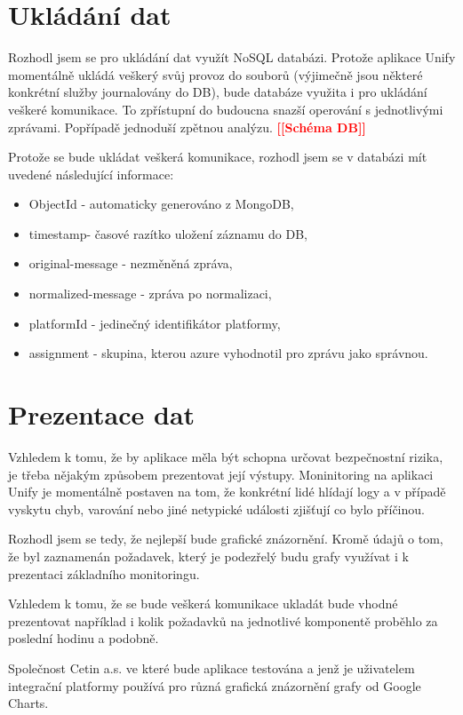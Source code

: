 \documentclass[thesis=M,czech]{FITthesis}[2012/10/20]
\newcommand{\todo}[1]{\textcolor{red}{\textbf{[[#1]]}}}
\begin{document}
	\section{Ukládání dat}
	\label{sec:data_storing}
	Rozhodl jsem se pro ukládání dat využít NoSQL databázi. Protože aplikace Unify momentálně ukládá veškerý svůj provoz do souborů (výjimečně jsou některé konkrétní služby journalovány do DB), bude databáze využita i pro ukládání veškeré komunikace. To zpřístupní do budoucna snazší operování s jednotlivými zprávami. Popřípadě jednoduší zpětnou analýzu.
	\todo{Schéma DB}
	
	
	Protože se bude ukládat veškerá komunikace, rozhodl jsem se v databázi mít uvedené následující informace:
	
	
	\begin{itemize} 
		\item ObjectId - automaticky generováno z MongoDB,
		\item timestamp- časové razítko uložení záznamu do DB,
		\item original-message - nezměněná zpráva,
		\item normalized-message - zpráva po normalizaci,
		\item platformId - jedinečný identifikátor platformy,
		\item assignment - skupina, kterou azure vyhodnotil pro zprávu jako správnou. 		
	\end{itemize}
		
	\section{Prezentace dat}
		\label{sec:data_prezentation}
		Vzhledem k tomu, že by aplikace měla být schopna určovat bezpečnostní rizika, je třeba nějakým způsobem prezentovat její výstupy. Moninitoring na aplikaci Unify je momentálně postaven na tom, že konkrétní lidé hlídají logy a v případě vyskytu chyb, varování nebo jiné netypické události zjišťují co bylo příčinou.
		
		Rozhodl jsem se tedy, že nejlepší bude grafické znázornění. Kromě údajů o tom, že byl zaznamenán požadavek, který je podezřelý budu grafy využívat i k prezentaci základního monitoringu. 
		
		Vzhledem k tomu, že se bude veškerá komunikace ukladát bude vhodné prezentovat například i kolik požadavků na jednotlivé komponentě proběhlo za poslední hodinu a podobně.
		
		Společnost Cetin a.s. \cite{cetin} ve které bude aplikace testována a jenž je uživatelem integrační platformy používá pro různá grafická znázornění grafy od Google Charts\cite{googleCharts}. 
		
\end{document}
